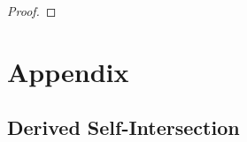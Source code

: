 \documentclass[12pt]{article}
\begin{document}
\begin{proof}

    
\end{proof}



\section{Appendix}

\subsection{Derived Self-Intersection}
\end{document}

